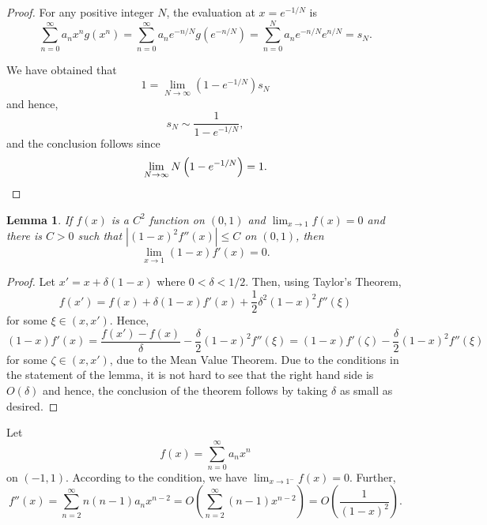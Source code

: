 \documentclass[12pt]{amsart}
\newtheorem{lemma}[theorem]{Lemma}
\begin{document}
\begin{enumerate}[label=(\alph*)]
\begin{proof}
	For any positive integer $N$, the evaluation at $x = e^{-1/N}$ is 
	\begin{equation*}
		\sum_{n = 0}^\infty a_nx^ng(x^n) = \sum_{n = 0}^\infty a_n e^{-n/N}g(e^{-n/N}) = \sum_{n = 0}^N a_n e^{-n/N}e^{n/N} = s_N.
	\end{equation*}

	We have obtained that 
	\begin{equation*}
		1 = \lim_{N\to\infty} (1 - e^{-1/N})s_N
	\end{equation*}
	and hence, 
	\begin{equation*}
		s_N\sim\frac{1}{1 - e^{-1/N}},
	\end{equation*}
	and the conclusion follows since 
	\begin{equation*}
		\lim_{N\to\infty} N\left(1 - e^{-1/N}\right) = 1.\qedhere
	\end{equation*}
\end{proof}

\begin{lemma}
	If $f(x)$ is a $C^2$ function on $(0, 1)$ and $\lim_{x\to 1} f(x) = 0$ and there is $C > 0$ such that $|(1 - x)^2f''(x)|\le C$ on $(0, 1)$, then 
	\begin{equation*}
		\lim_{x\to 1} (1 - x)f'(x) = 0.
	\end{equation*}
\end{lemma}
\begin{proof}
	Let $x' = x + \delta(1 - x)$ where $0 < \delta < 1/2$. Then, using Taylor's Theorem, 
	\begin{equation*}
		f(x') = f(x) + \delta(1 - x)f'(x) + \frac{1}{2}\delta^2(1 - x)^2f''(\xi)
	\end{equation*}
	for some $\xi\in(x, x')$. Hence, 
	\begin{equation*}
		(1 - x)f'(x) = \frac{f(x') - f(x)}{\delta} - \frac{\delta}{2}(1 - x)^2f''(\xi) = (1 - x)f'(\zeta) - \frac{\delta}{2}(1 - x)^2f''(\xi)
	\end{equation*}
	for some $\zeta\in(x, x')$, due to the Mean Value Theorem. Due to the conditions in the statement of the lemma, it is not hard to see that the right hand side is $O(\delta)$ and hence, the conclusion of the theorem follows by taking $\delta$ as small as desired.
\end{proof}

Let 
\begin{equation*}
	f(x) = \sum_{n = 0}^\infty a_nx^n
\end{equation*}
on $(-1, 1)$. According to the condition, we have $\lim_{x\to 1^-} f(x) = 0$. Further, 
\begin{equation*}
	f''(x) = \sum_{n = 2}^\infty n(n - 1)a_nx^{n - 2} = O\left(\sum_{n = 2}^\infty (n - 1)x^{n - 2}\right) = O\left(\frac{1}{(1 - x)^2}\right).
\end{equation*}


\end{enumerate}
\end{document}

